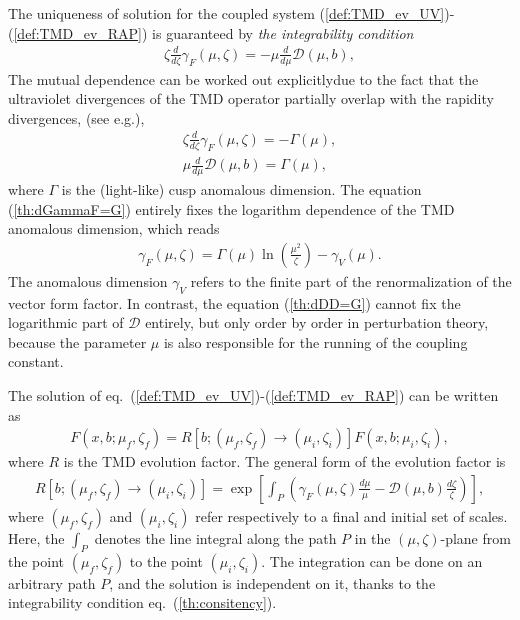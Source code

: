 \documentclass[prd,nofootinbib,eqsecnum,final]{revtex4}
\renewcommand{\(}{\left(}
\renewcommand{\)}{\right)}
\renewcommand{\[}{\left[}
\renewcommand{\]}{\right]}
\begin{document}
The uniqueness of solution for the coupled system (\ref{def:TMD_ev_UV})-(\ref{def:TMD_ev_RAP}) is guaranteed by \textit{the integrability condition}
\begin{eqnarray}\label{th:consitency}
\zeta \frac{d}{d\zeta}\gamma_F(\mu,\zeta)=-\mu \frac{d}{d\mu}\mathcal{D}(\mu,b),
\end{eqnarray} 
The mutual dependence can be worked out  explicitlydue to the fact that the ultraviolet divergences of the TMD operator partially overlap with the rapidity divergences, (see e.g.\cite{Collins:2011zzd,Vladimirov:2017ksc}), 
\begin{eqnarray}\label{th:dGammaF=G}
\zeta \frac{d}{d\zeta}\gamma_F(\mu,\zeta)=-\Gamma(\mu),
\\\label{th:dDD=G}
\mu \frac{d}{d\mu}\mathcal{D}(\mu,b)=\Gamma(\mu),
\end{eqnarray}
where $\Gamma$ is the (light-like) cusp anomalous dimension. The equation (\ref{th:dGammaF=G}) entirely fixes the logarithm dependence of the TMD anomalous dimension, which reads
\begin{eqnarray}\label{th:gammaV}
\gamma_F(\mu,\zeta)=\Gamma(\mu) \ln\(\frac{\mu^2}{\zeta}\)-\gamma_V(\mu).
\end{eqnarray}
The anomalous dimension $\gamma_V$ refers to the finite part of the renormalization of the vector form factor. In contrast, the equation (\ref{th:dDD=G}) cannot fix the logarithmic part of $\mathcal{D}$ entirely, but only order by order in  perturbation theory, because the parameter $\mu$ is also responsible for the running of the coupling constant.

The solution of eq.~(\ref{def:TMD_ev_UV})-(\ref{def:TMD_ev_RAP})  can be written as
\begin{eqnarray}\label{th:TMD_evol}
F(x,b;\mu_f,\zeta_f)=R[b;(\mu_f,\zeta_f)\to (\mu_i,\zeta_i)]F(x,b;\mu_i,\zeta_i),
\end{eqnarray}
where $R$ is the TMD evolution factor. The general form of the evolution factor is
\begin{eqnarray}\label{th:TMD_R}
R[b;(\mu_f,\zeta_f)\to (\mu_i,\zeta_i)]=\exp\[\int_P \(\gamma_F(\mu,\zeta)\frac{d\mu}{\mu} -\mathcal{D}(\mu,b)\frac{d\zeta}{\zeta}\)\] ,
\end{eqnarray}
where $(\mu_f,\zeta_f)$ and $(\mu_i,\zeta_i)$ refer respectively to a final  and initial set of scales. Here, the $\int_P$ denotes the line integral along the path $P$ in the $(\mu,\zeta)$-plane from the point $(\mu_f,\zeta_f)$ to the point $(\mu_i,\zeta_i)$. The integration can be done on an arbitrary path $P$, and the solution is independent on it, thanks to the integrability condition eq.~(\ref{th:consitency}). 
\end{document}
